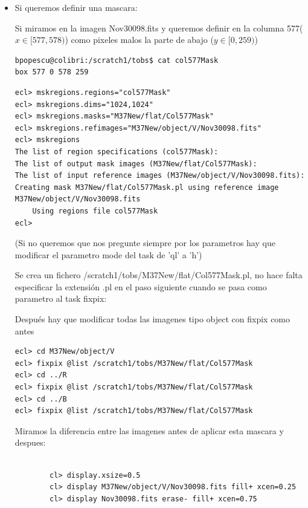 \documentclass{article}
\begin{document}
\begin{itemize}
\begin{verbatim}
\end{verbatim}

\item Si queremos definir una mascara:

Si miramos en la imagen  Nov30098.fits y queremos definir en la columna 577($ x \in [577,578) $) como pixeles malos la parte de abajo ($ y \in [0, 259) $)
\begin{verbatim}
bpopescu@colibri:/scratch1/tobs$ cat col577Mask 
box 577 0 578 259
\end{verbatim}

\begin{verbatim}
ecl> mskregions.regions="col577Mask"
ecl> mskregions.dims="1024,1024"
ecl> mskregions.masks="M37New/flat/Col577Mask"
ecl> mskregions.refimages="M37New/object/V/Nov30098.fits"
ecl> mskregions
The list of region specifications (col577Mask): 
The list of output mask images (M37New/flat/Col577Mask): 
The list of input reference images (M37New/object/V/Nov30098.fits): 
Creating mask M37New/flat/Col577Mask.pl using reference image M37New/object/V/Nov30098.fits
    Using regions file col577Mask
ecl> 
\end{verbatim}
(Si no queremos que nos pregunte siempre por los parametros hay que modificar el parametro mode del task de 'ql' a 'h')

Se crea un fichero /scratch1/tobs/M37New/flat/Col577Mask.pl, no hace falta especificar la extensión .pl en el paso siguiente cuando se pasa como parametro al task fixpix:

Después hay que modificar todas las imagenes tipo object con fixpix como antes


\begin{verbatim}
ecl> cd M37New/object/V
ecl> fixpix @list /scratch1/tobs/M37New/flat/Col577Mask
ecl> cd ../R
ecl> fixpix @list /scratch1/tobs/M37New/flat/Col577Mask
ecl> cd ../B
ecl> fixpix @list /scratch1/tobs/M37New/flat/Col577Mask
\end{verbatim}

Miramos la diferencia entre las imagenes antes de aplicar esta mascara y despues:
			
\begin{verbatim}

        cl> display.xsize=0.5
        cl> display M37New/object/V/Nov30098.fits fill+ xcen=0.25
        cl> display Nov30098.fits erase- fill+ xcen=0.75


\end{verbatim}


\end{itemize}
\end{document}

